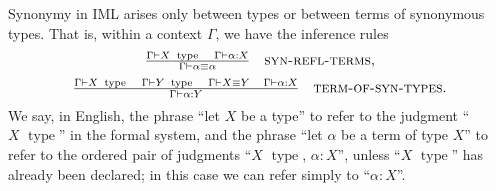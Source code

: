 \documentclass{article}
\newcommand{\infrule}[3]{\genfrac{}{}{}{}{#1}{#2}\hspace{1em}{\textsc{#3}}}
\DeclareMathOperator{\type}{~type}
\newcommand{\gives}{\vdash}
\newcommand{\1}{\textbf{1}}
\newcommand{\0}{\mathbf{0}}
\newcommand{\2}{\textbf{2}}
\begin{document}
Synonymy in IML arises only between types or between terms of synonymous types. That is, within a context \( \Gamma \), we have the inference rules
\[ \OD \infrule{\Gamma \gives X \type \hspace{1em} \Gamma \gives \alpha : X}{\Gamma \gives \alpha \equiv \alpha}{syn-refl-terms}, \]
\[ \OD \infrule{\Gamma \gives X \type \hspace{1em} \Gamma \gives Y \type \hspace{1em} \Gamma \gives X \equiv Y \hspace{1em} \Gamma \gives \alpha : X}{\Gamma \gives \alpha : Y}{term-of-syn-types}. \]
We say, in English, the phrase ``let \( X \) be a type'' to refer to the judgment ``\( X \type \)'' in the formal system, and the phrase ``let \( \alpha \) be a term of type \( X \)'' to refer to the ordered pair of judgments ``\( X \type \), \( \alpha : X \)'', unless ``\( X \type \)'' has already been declared; in this case we can refer simply to ``\( \alpha : X \)''.
\end{document}
